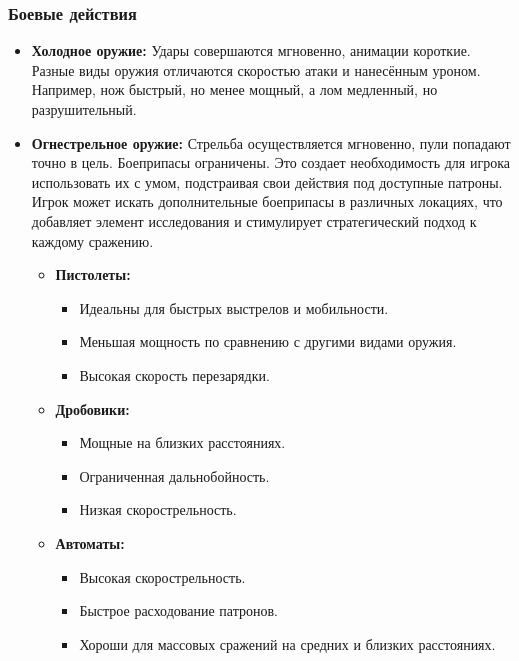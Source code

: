\documentclass[12pt]{article}
\begin{document}
        \subsubsection{Боевые действия}
        
        \begin{itemize}
            \item \textbf{Холодное оружие:} Удары совершаются мгновенно, анимации короткие. Разные виды оружия отличаются скоростью атаки и нанесённым уроном. Например, нож быстрый, но менее мощный, а лом медленный, но разрушительный.
            \item \textbf{Огнестрельное оружие:} Стрельба осуществляется мгновенно, пули попадают точно в цель. Боеприпасы ограничены.  Это создает необходимость для игрока использовать их с умом, подстраивая свои действия под доступные патроны. Игрок может искать дополнительные боеприпасы в различных локациях, что добавляет элемент исследования и стимулирует стратегический подход к каждому сражению.
            \begin{itemize}
                \item \textbf{Пистолеты:} 
                \begin{itemize}
                    \item Идеальны для быстрых выстрелов и мобильности.
                    \item Меньшая мощность по сравнению с другими видами оружия.
                    \item Высокая скорость перезарядки.
                \end{itemize}
                \item \textbf{Дробовики:} 
                \begin{itemize}
                    \item Мощные на близких расстояниях.
                    \item Ограниченная дальнобойность.
                    \item Низкая скорострельность.
                \end{itemize}
                \item \textbf{Автоматы:} 
                \begin{itemize}
                    \item Высокая скорострельность.
                    \item Быстрое расходование патронов.
                    \item Хороши для массовых сражений на средних и близких расстояниях.

\end{itemize}
\end{itemize}
\end{itemize}
\end{document}
